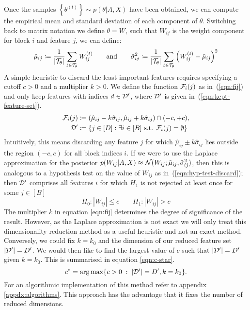 Once the samples $\left\{ \theta^{(t)} \right\} \sim p(\theta | A, X)$
have been obtained, we can compute the empirical mean and standard deviation of each component of $\theta$. Switching back to matrix notation we define $\theta = W$, such that $W_{ij}$ is the weight component for block $i$ and feature $j$, we can define:
%
\begin{equation}
	\hat{\mu}_{ij} \coloneqq \frac{1}{|\mathcal{T}_\theta|} \sum_{t \in \mathcal{T}_\theta} W_{ij}^{(t)} \qquad \textrm{and} \qquad
	\hat{\sigma}_{ij}^2 \coloneqq \frac{1}{|\mathcal{T}_\theta|} \sum_{t \in \mathcal{T}_\theta} \left( W_{ij}^{(t)} - \hat{\mu}_{ij} \right)^2
\end{equation}
%
A simple heuristic to discard the least important features requires specifying a cutoff $c > 0$ and a multiplier $k > 0$. We define the function $\mathcal{F}_i(j)$ 
as in~(\ref{eqn:fij}) and only keep features with indices $d \in \mathcal{D}'$, where $\mathcal{D}'$ is given in~(\ref{eqn:kept-feature-set}).
%
\begin{align}
	\mathcal{F}_i(j) &\coloneqq (\hat{\mu}_{ij} - k \hat{\sigma}_{ij}, \hat{\mu}_{ij} + k \hat{\sigma}_{ij}) \cap (-c, +c),
	\label{eqn:fij} \\
	\mathcal{D}' &\coloneqq \left\{ j \in [D] : \exists i \in [B] \textrm{ s.t. }  \mathcal{F}_i(j) = \emptyset \right\}
	\label{eqn:kept-feature-set}
\end{align}
%
Intuitively, this means discarding any feature $j$ for which 
$\hat{\mu}_{ij} \pm k\hat{\sigma}_{ij}$ lies outside the region
$(-c, c)$ for all block indices $i$. If we were to use the Laplace approximation for the posterior $p(W_{ij} | A, X) \approx \mathcal{N}(W_{ij}; \hat{\mu}_{ij}, \hat{\sigma}_{ij}^2)$, then this is analogous to a hypothesis test on the value of $W_{ij}$ as in~(\ref{eqn:hyp-test-discard});
then $\mathcal{D}'$ comprises all features $i$ for which $H_1$ is not rejected at least once for some $j \in [B]$
%
\begin{equation}
	H_0: |W_{ij}| \leq c \qquad
	H_1: |W_{ij}| > c
	\label{eqn:hyp-test-discard}
\end{equation}
%
The multiplier $k$ in equation \ref{eqn:fij} determines the degree of significance of the result. However, as the Laplace approximation is not exact we will only treat this dimensionality reduction method as a useful heuristic and not an exact method. Conversely, we could fix $k=k_0$ and the dimension of our reduced feature set $|\mathcal{D}'|=D'$. We would then like to find the largest value of $c$ such that $|\mathcal{D}'|=D'$ given $k=k_0$. This is summarised in equation \ref{eqn:c-star}.
%
\begin{equation}
	c^* = \operatorname*{arg\,max} \{c>0\; : \;|\mathcal{D}'| = D', k=k_0\}.
	\label{eqn:c-star}
\end{equation}
%
For an algorithmic implementation of this method refer to appendix \ref{appdx:algorithms}. This approach has the advantage that it fixes the number of reduced dimensions.

